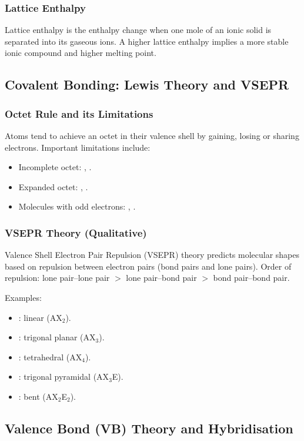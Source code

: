 \documentclass[12pt,a4paper]{article}
\begin{document}
\subsubsection{Lattice Enthalpy}
Lattice enthalpy is the enthalpy change when one mole of an ionic solid is separated into its gaseous ions. A higher lattice enthalpy implies a more stable ionic compound and higher melting point.

\subsection{Covalent Bonding: Lewis Theory and VSEPR}

\subsubsection{Octet Rule and its Limitations}
Atoms tend to achieve an octet in their valence shell by gaining, losing or sharing electrons. Important limitations include:
\begin{itemize}
    \item Incomplete octet: , .
    \item Expanded octet: , .
    \item Molecules with odd electrons: , .
\end{itemize}

\subsubsection{VSEPR Theory (Qualitative)}
Valence Shell Electron Pair Repulsion (VSEPR) theory predicts molecular shapes based on repulsion between electron pairs (bond pairs and lone pairs).  
Order of repulsion: lone pair–lone pair $>$ lone pair–bond pair $>$ bond pair–bond pair.

Examples:
\begin{itemize}
    \item {}: linear (AX$_2$).
    \item {}: trigonal planar (AX$_3$).
    \item {}: tetrahedral (AX$_4$).
    \item {}: trigonal pyramidal (AX$_3$E).
    \item {}: bent (AX$_2$E$_2$).
\end{itemize}

\subsection{Valence Bond (VB) Theory and Hybridisation}
\end{document}
